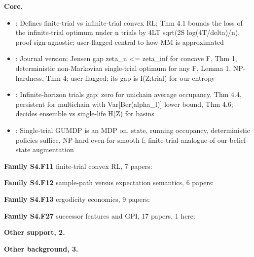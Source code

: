 \documentclass[10pt]{article}
\newcommand{\memb}[1]{\par\smallskip\textbf{#1}\quad}
\begin{document}
\memb{Core.}
\begin{itemize}[nosep,leftmargin=1.2em]
\item \citet{Mutti-challenging22}: Defines finite-trial vs infinite-trial convex RL; Thm 4.1 bounds the loss of the infinite-trial optimum under n trials by 4LT sqrt(2S log(4T/delta)/n), proof sign-agnostic; user-flagged central to how MM is approximated
\item \citet{Mutti-convex23}: Journal version: Jensen gap zeta\_n \textless{}= zeta\_inf for concave F, Thm 1, deterministic non-Markovian single-trial optimum for any F, Lemma 1, NP-hardness, Thm 4; user-flagged; its gap is I(Z;trial) for our entropy
\item \citet{Santos-number25}: Infinite-horizon trials gap: zero for unichain average occupancy, Thm 4.4, persistent for multichain with Var[Ber(alpha\_l)] lower bound, Thm 4.6; decides ensemble vs single-life H(Z) for basins
\item \citet{Santos-solving26}: Single-trial GUMDP is an MDP on, state, running occupancy, deterministic policies suffice, NP-hard even for smooth f; finite-trial analogue of our belief-state augmentation
\end{itemize}
\memb{Family S4.F11} finite-trial convex RL, 7 papers: {\footnotesize \citetext{\citealp{Mutti-challenging22}; \citealp{Mutti-convex23}; \citealp{Santos-number25}; \citealp{Santos-solving26}; \citealp{Mutti-importance22}; \citealp{DePaola-enhancing25}; \citealp{Santos-riskaware26}}}

\memb{Family S4.F12} sample-path versus expectation semantics, 6 papers: {\footnotesize \citetext{\citealp{Mannor-empirical05}; \citealp{Ross-sample87}; \citealp{Ross-markov89}; \citealp{Altman-rate94}; \citealp{Chatterjee-unifying17}; \citealp{Brazdil-markov14}}}

\memb{Family S4.F13} ergodicity economics, 9 papers: {\footnotesize \citetext{\citealp{Peters-evaluating16}; \citealp{Peters-ergodicity19}; \citealp{Baumann-ergodicity26}; \citealp{Kelly-new56}; \citealp{Peters-time11}; \citealp{Meder-ergodicity21}; \citealp{Baumann-reinforcement25}; \citealp{Sheng-beyond25}; \citealp{Verbruggen-modelagnostic26}}}

\memb{Family S4.F27} successor features and GPI, 17 papers, 1 here: {\footnotesize \citetext{\citealp{Mertens-matter26}}}

\memb{Other support, 2.} \citetext{\citealp{Chen-you22}; \citealp{Berrueta-maximum24}}

\memb{Other background, 3.} {\footnotesize \citetext{\citealp{Cheung-exploration19}; \citealp{Poiani-theoretical26}; \citealp{Sharma-autonomous21}}}
\end{document}
